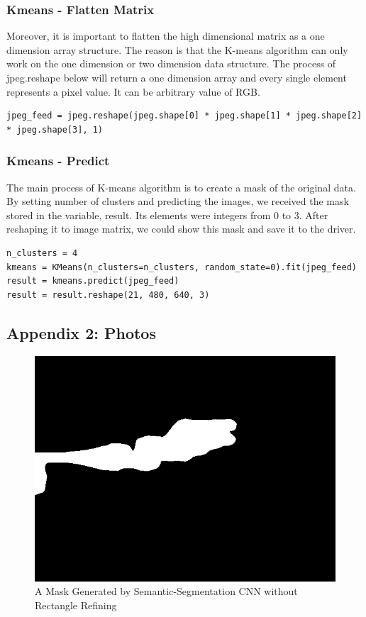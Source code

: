 \documentclass[10pt,journal,compsoc, draftclsnofoot,onecolumn]{IEEEtran}
\begin{document}
\subsubsection{Kmeans - Flatten Matrix}
Moreover, it is important to flatten the high dimensional matrix as a one dimension array structure. The reason is that the K-means algorithm can only work on the one dimension or two dimension data structure. The process of jpeg.reshape below will return a one dimension array and every single element represents a pixel value. It can be arbitrary value of RGB. 

\begin{verbatim}
jpeg_feed = jpeg.reshape(jpeg.shape[0] * jpeg.shape[1] * jpeg.shape[2] * jpeg.shape[3], 1)
\end{verbatim}

\subsubsection{Kmeans - Predict}
The main process of K-means algorithm is to create a mask of the original data. By setting number of clusters and predicting the images, we received the mask stored in the variable, result. Its elements were integers from 0 to 3. After reshaping it to image matrix, we could show this mask and save it to the driver. 

\begin{verbatim}
n_clusters = 4
kmeans = KMeans(n_clusters=n_clusters, random_state=0).fit(jpeg_feed)
result = kmeans.predict(jpeg_feed)
result = result.reshape(21, 480, 640, 3)
\end{verbatim}



\subsection{Appendix 2: Photos}
\begin{figure}[H]
  \begin{center}
    \includegraphics[width=1.\textwidth]{1548556288818083016_pred.png}
  \end{center}
  \caption{A Mask Generated by Semantic-Segmentation CNN without Rectangle Refining}
\end{figure}
\end{document}
